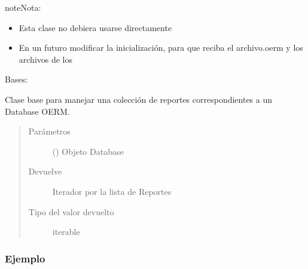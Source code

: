 \documentclass[a4paper,12pt,spanish]{sphinxmanual}
\begin{document}
\begin{sphinxadmonition}{note}{Nota:}\begin{itemize}
\item {} 
Esta clase no debiera usarse directamente

\item {} 
En un futuro modificar la inicialización, para que reciba el archivo.oerm y los archivos de los

\end{itemize}
\end{sphinxadmonition}

\begin{fulllineitems}
\label{\detokenize{openerm.Reports:openerm.Reports.Reports}}
Bases: 

Clase base para manejar una colección de reportes correspondientes a
un Database OERM.
\begin{quote}\begin{description}
\item[{Parámetros}] \leavevmode
{} ({\hyperref[\detokenize{openerm.Database:module-openerm.Database}]{}}) \textendash{} Objeto Database

\item[{Devuelve}] \leavevmode
Iterador por la lista de Reportes

\item[{Tipo del valor devuelto}] \leavevmode
iterable

\end{description}\end{quote}
\subsubsection*{Ejemplo}


\end{fulllineitems}
\end{document}
